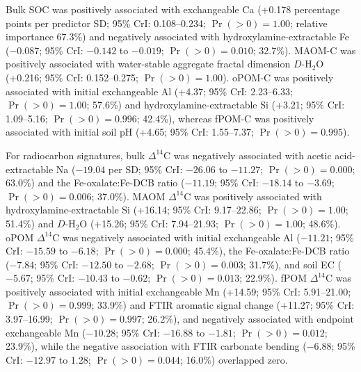 \documentclass[preprint,12pt]{elsarticle}
\begin{document}
Bulk SOC was positively associated with exchangeable Ca (+0.178 percentage points per predictor SD; 95\% CrI: 0.108--0.234; $\Pr(>0) = 1.00$; relative importance 67.3\%) and negatively associated with hydroxylamine-extractable Fe ($-0.087$; 95\% CrI: $-0.142$ to $-0.019$; $\Pr(>0) = 0.010$; 32.7\%). MAOM-C was positively associated with water-stable aggregate fractal dimension $D$-H$_2$O (+0.216; 95\% CrI: 0.152--0.275; $\Pr(>0) = 1.00$). oPOM-C was positively associated with initial exchangeable Al (+4.37; 95\% CrI: 2.23--6.33; $\Pr(>0) = 1.00$; 57.6\%) and hydroxylamine-extractable Si (+3.21; 95\% CrI: 1.09--5.16; $\Pr(>0) = 0.996$; 42.4\%), whereas fPOM-C was positively associated with initial soil pH (+4.65; 95\% CrI: 1.55--7.37; $\Pr(>0) = 0.995$).

For radiocarbon signatures, bulk $\Delta^{14}$C was negatively associated with acetic acid-extractable Na ($-19.04$\textperthousand{} per SD; 95\% CrI: $-26.06$ to $-11.27$; $\Pr(>0) = 0.000$; 63.0\%) and the Fe-oxalate:Fe-DCB ratio ($-11.19$\textperthousand{}; 95\% CrI: $-18.14$ to $-3.69$; $\Pr(>0) = 0.006$; 37.0\%). MAOM $\Delta^{14}$C was positively associated with hydroxylamine-extractable Si (+16.14\textperthousand{}; 95\% CrI: 9.17--22.86; $\Pr(>0) = 1.00$; 51.4\%) and $D$-H$_2$O (+15.26\textperthousand{}; 95\% CrI: 7.94--21.93; $\Pr(>0) = 1.00$; 48.6\%). oPOM $\Delta^{14}$C was negatively associated with initial exchangeable Al ($-11.21$\textperthousand{}; 95\% CrI: $-15.59$ to $-6.18$; $\Pr(>0) = 0.000$; 45.4\%), the Fe-oxalate:Fe-DCB ratio ($-7.84$\textperthousand{}; 95\% CrI: $-12.50$ to $-2.68$; $\Pr(>0) = 0.003$; 31.7\%), and soil EC ($-5.67$\textperthousand{}; 95\% CrI: $-10.43$ to $-0.62$; $\Pr(>0) = 0.013$; 22.9\%). fPOM $\Delta^{14}$C was positively associated with initial exchangeable Mn (+14.59\textperthousand{}; 95\% CrI: 5.91--21.00; $\Pr(>0) = 0.999$; 33.9\%) and FTIR aromatic signal change (+11.27\textperthousand{}; 95\% CrI: 3.97--16.99; $\Pr(>0) = 0.997$; 26.2\%), and negatively associated with endpoint exchangeable Mn ($-10.28$\textperthousand{}; 95\% CrI: $-16.88$ to $-1.81$; $\Pr(>0) = 0.012$; 23.9\%), while the negative association with FTIR carbonate bending ($-6.88$\textperthousand{}; 95\% CrI: $-12.97$ to 1.28; $\Pr(>0) = 0.044$; 16.0\%) overlapped zero.
\end{document}
